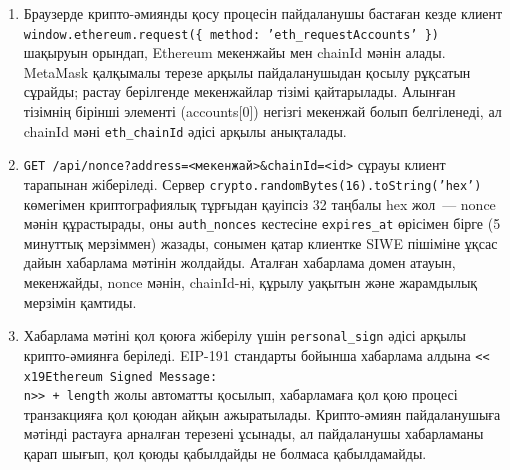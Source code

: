\documentclass[14pt,a4paper]{extarticle}
\begin{document}
\begin{enumerate}
\item Браузерде крипто-әмиянды қосу процесін пайдаланушы бастаған кезде клиент \texttt{window.ethereum.request(\{ method: 'eth\_requestAccounts' \})} шақыруын орындап, Ethereum мекенжайы мен chainId мәнін алады. MetaMask қалқымалы терезе арқылы пайдаланушыдан қосылу рұқсатын сұрайды; растау берілгенде мекенжайлар тізімі қайтарылады. Алынған тізімнің бірінші элементі (accounts[0]) негізгі мекенжай болып белгіленеді, ал chainId мәні \texttt{eth\_chainId} әдісі арқылы анықталады.

\item \texttt{GET /api/nonce?address=<мекенжай>\&chainId=<id>} сұрауы клиент тарапынан жіберіледі. Сервер \texttt{crypto.randomBytes(16).toString('hex')} көмегімен криптографиялық тұрғыдан қауіпсіз 32 таңбалы hex жол~--- nonce мәнін құрастырады, оны \texttt{auth\_nonces} кестесіне \texttt{expires\_at} өрісімен бірге (5 минуттық мерзіммен) жазады, сонымен қатар клиентке SIWE пішіміне ұқсас дайын хабарлама мәтінін жолдайды. Аталған хабарлама домен атауын, мекенжайды, nonce мәнін, chainId-ні, құрылу уақытын және жарамдылық мерзімін қамтиды.

\item Хабарлама мәтіні қол қоюға жіберілу үшін \texttt{personal\_sign} әдісі арқылы крипто-әмиянға беріледі. EIP-191 стандарты бойынша хабарлама алдына \texttt{<<\\x19Ethereum Signed Message:\\n>> + length} жолы автоматты қосылып, хабарламаға қол қою процесі транзакцияға қол қоюдан айқын ажыратылады. Крипто-әмиян пайдаланушыға мәтінді растауға арналған терезені ұсынады, ал пайдаланушы хабарламаны қарап шығып, қол қоюды қабылдайды не болмаса қабылдамайды.


\end{enumerate}
\end{document}
